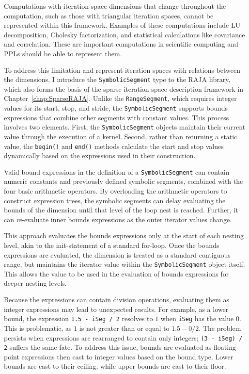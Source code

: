 Computations with iteration space dimensions that change throughout the computation, such as those with triangular iteration spaces, cannot be represented within this framework. 
Examples of these computations include LU decomposition, Cholesky factorization, and statistical calculations like covariance and correlation.
These are important computations in scientific computing and PPLs should be able to represent them.

To address this limitation and represent iteration spaces with relations between the dimensions, I introduce the \verb.SymbolicSegment. type to the RAJA library, which also forms the basis of the sparse iteration space description framework in Chapter~\ref{chap:SparseRAJA}. 
Unlike the \verb.RangeSegment., which requires integer values for its start, stop, and stride, the \verb.SymbolicSegment. supports bounds expressions that combine other segments with constant values. 
This process involves two elements.
First, the \verb.SymbolicSegment. objects maintain their current value through the execution of a kernel. 
Second, rather than returning a static value, the \verb.begin(). and \verb.end(). methods calculate the start and stop values dynamically based on the expressions used in their construction. 

Valid bound expressions in the definition of a \verb.SymbolicSegment. can contain numeric constants and previously defined symbolic segments, combined with the four basic arithmetic operators. 
By overloading the arithmetic operators to construct expression trees, the symbolic segments can delay evaluating the bounds of the dimension until that level of the loop nest is reached.
Further, it can \textit{re}-evaluate inner bounds expressions as the outer iterator values change.

This approach evaluates the bounds expressions only at the start of each nesting level, akin to the init-statement of a standard for-loop.
Once the bounds expressions are evaluated, the dimension is treated as a standard contiguous range, but maintains the iterator value within the \verb.SymbolicSegment. object itself.
This allows the value to be used in the evaluation of bounds expressions for deeper nesting levels.

Because the expressions can contain division operations, evaluating them as integer expressions may lead to unexpected results. 
For example, as a lower bound, the expression \verb_1.5 - iSeg / 2_ resolves to $1$ when \verb.iSeg. has the value $0$. 
This is problematic, as $1$ is not greater than or equal to $1.5 - 0/2$.
The problem persists when expressions are rearranged to contain only integers; \verb.(3 - iSeg) / 2. suffers the same fate.
To address this issue, bounds are evaluated as floating point expressions then cast to integer values based on the bound type.
Lower bounds are cast to their ceiling, while upper bounds are cast to their floor.

